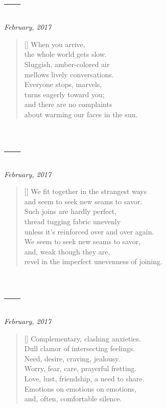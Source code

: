 \section{---}

\hfill\textit{February, 2017}

\begin{verse}[\textwidth]
  When you arrive,\\
  the whole world gets slow.\\
  Sluggish, amber-colored air\\
  mellows lively conversations.\\
  Everyone stops, marvels,\\
  turns eagerly toward you;\\
  and there are no complaints\\
  about warming our faces in the sun.
\end{verse}
\newpage

\section{---}

\hfill\textit{February, 2017}

\begin{verse}[\textwidth]
  We fit together in the strangest ways\\
  and seem to seek new seams to savor.\\
  Such joins are hardly perfect,\\
  thread tugging fabric unevenly\\
  unless it's reinforced over and over again.\\
  We seem to seek new seams to savor,\\
  and, weak though they are,\\
  revel in the imperfect unevenness of joining.
\end{verse}
\newpage

\section{---}

\hfill\textit{February, 2017}

\begin{verse}[\textwidth]
  Complementary, clashing anxieties.\\
  Dull clamor of intersecting feelings.\\
  Need, desire, craving, jealousy.\\
  Worry, fear, care, prayerful fretting.\\
  Love, lust, friendship, a need to share.\\
  Emotions on emotions on emotions,\\
  and, often, comfortable silence.
\end{verse}
\newpage


